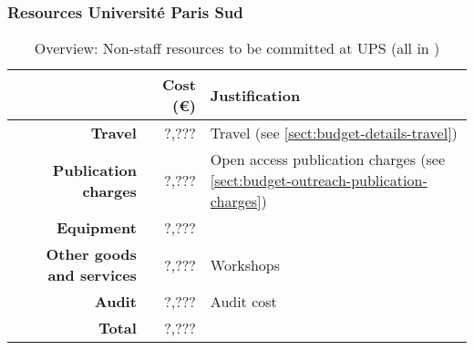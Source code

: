 %
%
%
%
%
%

\subsubsection{Resources Universit\'{e} Paris Sud}


\bigskip
\begin{table}[H]
\begin{tabular}{|r|r|p{9cm}|}
\hline
\textbf{} & \textbf{Cost (\euro)} & \textbf{Justification} \\\hline
\textbf{Travel} & ?,??? & Travel (see \ref{sect:budget-details-travel})\\\hline
\textbf{Publication charges} & ?,??? & Open access publication charges (see \ref{sect:budget-outreach-publication-charges})\\\hline
\textbf{Equipment} & ?,??? &  \\\hline    %

\textbf{Other goods and services} & ?,??? & Workshops \\\hline   %
\textbf{Audit} & ?,??? & Audit cost \\\hline
\textbf{Total} & ?,???\\\cline{1-2}
\end{tabular}
\caption{Overview: Non-staff resources to be committed at UPS (all in \texteuro)}\vspace*{-1em}
\end{table}



